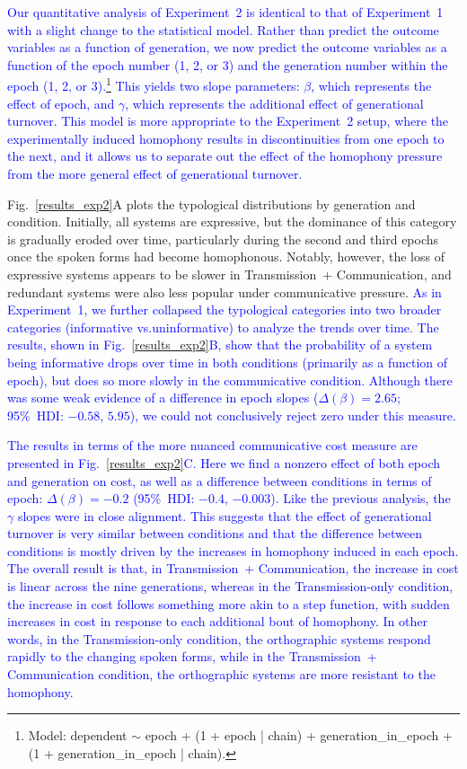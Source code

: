\documentclass[doc,biblatex]{apa7}
\newcommand\newmaterial[1]{\textcolor{blue}{#1}}
\begin{document}
\newmaterial{Our quantitative analysis of Experiment~2 is identical to that of Experiment~1 with a slight change to the statistical model. Rather than predict the outcome variables as a function of generation, we now predict the outcome variables as a function of the epoch number (1, 2, or 3) and the generation number within the epoch (1, 2, or 3).\footnote{Model: dependent $\sim$ epoch + (1 + epoch | chain) + generation\_in\_epoch + (1 + generation\_in\_epoch | chain).} This yields two slope parameters: $\beta$, which represents the effect of epoch, and $\gamma$, which represents the additional effect of generational turnover. This model is more appropriate to the Experiment~2 setup, where the experimentally induced homophony results in discontinuities from one epoch to the next, and it allows us to separate out the effect of the homophony pressure from the more general effect of generational turnover.}

Fig.~\ref{results_exp2}A plots the typological distributions by generation and condition. Initially, all systems are expressive, but the dominance of this category is gradually eroded over time, particularly during the second and third epochs once the spoken forms had become homophonous. Notably, however, the loss of expressive systems appears to be slower in Transmission~+ Communication, and redundant systems were also less popular under communicative pressure. \newmaterial{As in Experiment~1, we further collapsed the typological categories into two broader categories (informative vs.\@ uninformative) to analyze the trends over time. The results, shown in Fig.~\ref{results_exp2}B, show that the probability of a system being informative drops over time in both conditions (primarily as a function of epoch), but does so more slowly in the communicative condition. Although there was some weak evidence of a difference in epoch slopes ($\Delta(\beta) = 2.65$; 95\%~HDI: $-0.58$, $5.95$), we could not conclusively reject zero under this measure.}

\newmaterial{The results in terms of the more nuanced communicative cost measure are presented in Fig.~\ref{results_exp2}C. Here we find a nonzero effect of both epoch and generation on cost, as well as a difference between conditions in terms of epoch: $\Delta(\beta) = -0.2$ (95\%~HDI: $-0.4$, $-0.003$). Like the previous analysis, the $\gamma$ slopes were in close alignment. This suggests that the effect of generational turnover is very similar between conditions and that the difference between conditions is mostly driven by the increases in homophony induced in each epoch. The overall result is that, in Transmission~+ Communication, the increase in cost is linear across the nine generations, whereas in the Transmission-only condition, the increase in cost follows something more akin to a step function, with sudden increases in cost in response to each additional bout of homophony. In other words, in the Transmission-only condition, the orthographic systems respond rapidly to the changing spoken forms, while in the Transmission~+ Communication condition, the orthographic systems are more resistant to the homophony.}
\end{document}
